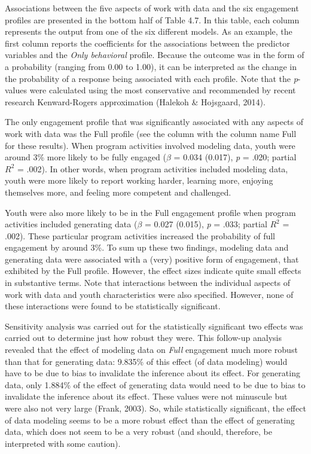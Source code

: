 \documentclass[]{book}
\theoremstyle{definition}
\theoremstyle{definition}
\theoremstyle{definition}
\theoremstyle{remark}
\begin{document}
Associations between the five aspects of work with data and the six
engagement profiles are presented in the bottom half of Table 4.7. In
this table, each column represents the output from one of the six
different models. As an example, the first column reports the
coefficients for the associations between the predictor variables and
the \emph{Only behavioral} profile. Because the outcome was in the form
of a probability (ranging from 0.00 to 1.00), it can be interpreted as
the change in the probability of a response being associated with each
profile. Note that the \emph{p}-values were calculated using the most
conservative and recommended by recent research Kenward-Rogers
approximation (Halekoh \& Hojsgaard, 2014).

The only engagement profile that was significantly associated with any
aspects of work with data was the Full profile (see the column with the
column name Full for these results). When program activities involved
modeling data, youth were around 3\% more likely to be fully engaged
(\(\beta\) = 0.034 (0.017), \emph{p} = .020; partial \(R^2\) = .002). In
other words, when program activities included modeling data, youth were
more likely to report working harder, learning more, enjoying themselves
more, and feeling more competent and challenged.

Youth were also more likely to be in the Full engagement profile when
program activities included generating data (\(\beta\) = 0.027 (0.015),
\emph{p} = .033; partial \(R^2\) = .002). These particular program
activities increased the probability of full engagement by around 3\%.
To sum up these two findings, modeling data and generating data were
associated with a (very) positive form of engagement, that exhibited by
the Full profile. However, the effect sizes indicate quite small effects
in substantive terms. Note that interactions between the individual
aspects of work with data and youth characteristics were also specified.
However, none of these interactions were found to be statistically
significant.

Sensitivity analysis was carried out for the statistically significant
two effects was carried out to determine just how robust they were. This
follow-up analysis revealed that the effect of modeling data on
\emph{Full} engagement much more robust than that for generating data:
9.835\% of this effect (of data modeling) would have to be due to bias
to invalidate the inference about its effect. For generating data, only
1.884\% of the effect of generating data would need to be due to bias to
invalidate the inference about its effect. These values were not
minuscule but were also not very large (Frank, 2003). So, while
statistically significant, the effect of data modeling seems to be a
more robust effect than the effect of generating data, which does not
seem to be a very robust (and should, therefore, be interpreted with
some caution).
\end{document}
